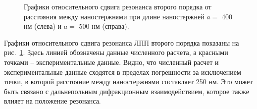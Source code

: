 \begin{figure}
\begin{subfigure}{.5\textwidth}
\end{subfigure}
\caption{Графики относительного сдвига резонанса второго порядка от расстояния между наностержнями при длине наностержней $ a = $ 400 нм (слева) и $ a = $ 500 нм (справа).}
\label{img:ashift}
\end{figure}

Графики относительного сдвига резонанса ЛПП второго порядка показаны на рис.~\ref{img:ashift}. Здесь линией обозначены данные численного расчета, а красными точками -- экспериментальные данные. Видно, что численный расчет и экспериментальные данные сходятся в пределах погрешности за исключением точки, в которой расстояние между наностержнями составляет 250 нм. Это может быть связано с дальнепольным дифракционным взаимодействием, которое также влияет на положение резонанса.

